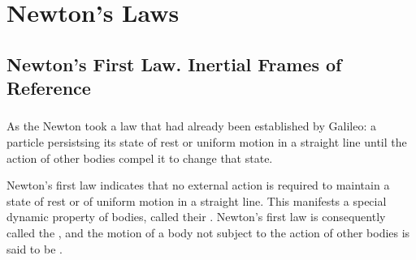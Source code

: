 

\chapter{Newton's Laws}
\label{ch-02}

\section{Newton's First Law. Inertial Frames of Reference}
\label{sec-2.1}
\subsection{}\label{2.1.1} As the  Newton took a law that had already been established by Galileo: a particle persistsing its state of rest or uniform motion in a straight line until the action of other bodies compel it to change that state.

Newton's first law indicates that no external action is required to maintain a state of rest or of uniform motion in a straight line. This manifests a special dynamic property of bodies, called their . Newton's first law is consequently called the , and the motion of a body not subject to the action of other bodies is said to be . 

